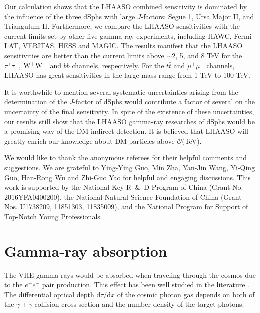 \documentclass[12pt,aps,prd,amsmath,amssymb,showpacs,floats,floatfix,nofootinbib]{revtex4-1}
\begin{document}
Our calculation shows that the LHAASO combined sensitivity is dominated by the influence of the three dSphs with large $J$-factors: Segue 1, Ursa Major II, and Triangulum II. Furthermore, we compare the LHAASO sensitivities with the current limits set by other five gamma-ray experiments, including HAWC, Fermi-LAT, VERITAS, HESS and MAGIC.
The results manifest that the LHAASO sensitivities are better than the current limits above $\sim2$, 5, and 8 TeV for the $\tau^+\tau^-$, $\rm W^+W^-$ and $b\bar{b}$ channels, respectively. For the $t\bar{t}$ and $\mu^{+}\mu^{-}$ channels, LHAASO has great sensitivities in the large mass range from 1 TeV to 100 TeV.


It is worthwhile to mention several systematic uncertainties arising from the determination of the $J$-factor of dSphs would contribute a factor of several on the uncertainty of the final sensitivity.
In spite of the existence of these uncertainties, our results still show that the LHAASO gamma-ray researches of dSphs would be a promising way of the DM indirect detection. It is believed that LHAASO will greatly enrich our knowledge about DM particles above ${\mathcal O}$(TeV).

\begin{acknowledgments}
We would like to thank the anonymous referees for their helpful comments and suggestions.
We are grateful to Ying-Ying Guo, Min Zha, Yan-Jin Wang, Yi-Qing Guo, Han-Rong Wu and Zhi-Guo Yao for helpful and engaging discussions.
This work is supported by the National Key R~$\&$~D Program of China (Grant No. 2016YFA0400200), the National Natural Science Foundation of China (Grant Nos. U1738209, 11851303, 11835009), and the National Program for Support of Top-Notch Young Professionals.
\end{acknowledgments}

\appendix
\section{Gamma-ray absorption} \label{gamma_absorption}
The VHE gamma-rays would be absorbed when traveling through the cosmos due to the $e^+e^-$ pair production.
This effect has been well studied in the literature \cite{Franceschini:2008tp,Gould:1967zzb}.
The differential optical depth $\mathrm{d}\tau/\mathrm{d}x$ of the cosmic photon gas depends on both of the $\gamma+\gamma$ collision cross section and the number density of the target photons.
\end{document}
